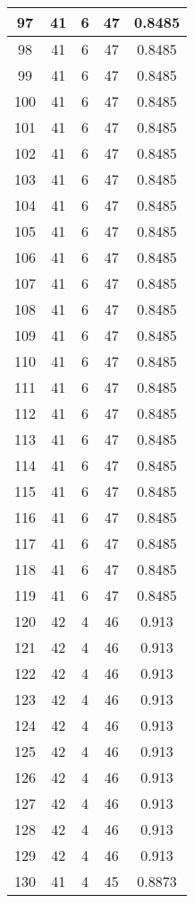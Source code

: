 \documentclass[letterpaper, 12pt]{article}
\begin{document}
\begin{longtable}{|c|c|c|c|c|}
\hline
97 & 41 & 6 & 47 & 0.8485 \\
\hline
98 & 41 & 6 & 47 & 0.8485 \\
\hline
99 & 41 & 6 & 47 & 0.8485 \\
\hline
100 & 41 & 6 & 47 & 0.8485 \\
\hline
101 & 41 & 6 & 47 & 0.8485 \\
\hline
102 & 41 & 6 & 47 & 0.8485 \\
\hline
103 & 41 & 6 & 47 & 0.8485 \\
\hline
104 & 41 & 6 & 47 & 0.8485 \\
\hline
105 & 41 & 6 & 47 & 0.8485 \\
\hline
106 & 41 & 6 & 47 & 0.8485 \\
\hline
107 & 41 & 6 & 47 & 0.8485 \\
\hline
108 & 41 & 6 & 47 & 0.8485 \\
\hline
109 & 41 & 6 & 47 & 0.8485 \\
\hline
110 & 41 & 6 & 47 & 0.8485 \\
\hline
111 & 41 & 6 & 47 & 0.8485 \\
\hline
112 & 41 & 6 & 47 & 0.8485 \\
\hline
113 & 41 & 6 & 47 & 0.8485 \\
\hline
114 & 41 & 6 & 47 & 0.8485 \\
\hline
115 & 41 & 6 & 47 & 0.8485 \\
\hline
116 & 41 & 6 & 47 & 0.8485 \\
\hline
117 & 41 & 6 & 47 & 0.8485 \\
\hline
118 & 41 & 6 & 47 & 0.8485 \\
\hline
119 & 41 & 6 & 47 & 0.8485 \\
\hline
120 & 42 & 4 & 46 & 0.913 \\
\hline
121 & 42 & 4 & 46 & 0.913 \\
\hline
122 & 42 & 4 & 46 & 0.913 \\
\hline
123 & 42 & 4 & 46 & 0.913 \\
\hline
124 & 42 & 4 & 46 & 0.913 \\
\hline
125 & 42 & 4 & 46 & 0.913 \\
\hline
126 & 42 & 4 & 46 & 0.913 \\
\hline
127 & 42 & 4 & 46 & 0.913 \\
\hline
128 & 42 & 4 & 46 & 0.913 \\
\hline
129 & 42 & 4 & 46 & 0.913 \\
\hline
130 & 41 & 4 & 45 & 0.8873 \\

\end{longtable}
\end{document}
